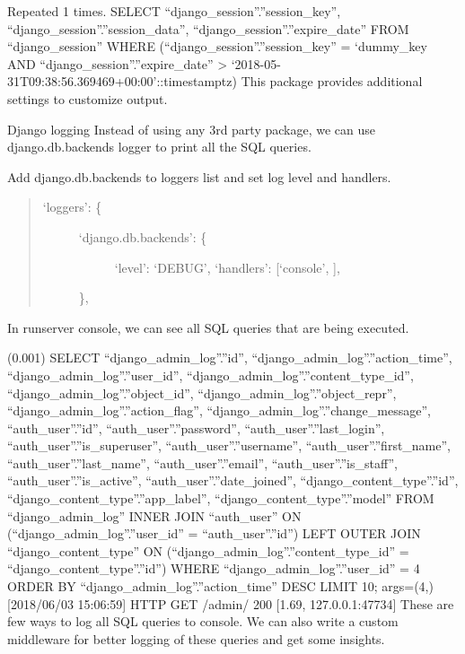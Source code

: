 \documentclass[letterpaper,11pt,english]{sphinxmanual}
\begin{document}
Repeated 1 times.
SELECT “django\_session”.”session\_key”,
“django\_session”.”session\_data”, “django\_session”.”expire\_date” FROM
“django\_session” WHERE (“django\_session”.”session\_key” =
‘dummy\_key AND “django\_session”.”expire\_date”
\textgreater{} ‘2018-05-31T09:38:56.369469+00:00’::timestamptz)
This package provides additional settings to customize output.

Django logging
Instead of using any 3rd party package, we can use django.db.backends logger to print all the SQL queries.

Add django.db.backends to loggers list and set log level and handlers.
\begin{quote}
\begin{description}
\item[{‘loggers’: \{}] \leavevmode\begin{description}
\item[{‘django.db.backends’: \{}] \leavevmode
‘level’: ‘DEBUG’,
‘handlers’: {[}‘console’, {]},

\end{description}

\},

\end{description}
\end{quote}

In runserver console, we can see all SQL queries that are being executed.

(0.001) SELECT “django\_admin\_log”.”id”, “django\_admin\_log”.”action\_time”, “django\_admin\_log”.”user\_id”, “django\_admin\_log”.”content\_type\_id”, “django\_admin\_log”.”object\_id”, “django\_admin\_log”.”object\_repr”, “django\_admin\_log”.”action\_flag”, “django\_admin\_log”.”change\_message”, “auth\_user”.”id”, “auth\_user”.”password”, “auth\_user”.”last\_login”, “auth\_user”.”is\_superuser”, “auth\_user”.”username”, “auth\_user”.”first\_name”, “auth\_user”.”last\_name”, “auth\_user”.”email”, “auth\_user”.”is\_staff”, “auth\_user”.”is\_active”, “auth\_user”.”date\_joined”, “django\_content\_type”.”id”, “django\_content\_type”.”app\_label”, “django\_content\_type”.”model” FROM “django\_admin\_log” INNER JOIN “auth\_user” ON (“django\_admin\_log”.”user\_id” = “auth\_user”.”id”) LEFT OUTER JOIN “django\_content\_type” ON (“django\_admin\_log”.”content\_type\_id” = “django\_content\_type”.”id”) WHERE “django\_admin\_log”.”user\_id” = 4 ORDER BY “django\_admin\_log”.”action\_time” DESC LIMIT 10; args=(4,)
{[}2018/06/03 15:06:59{]} HTTP GET /admin/ 200 {[}1.69, 127.0.0.1:47734{]}
These are few ways to log all SQL queries to console. We can also write a custom middleware for better logging of these queries and get some insights.
\end{document}

